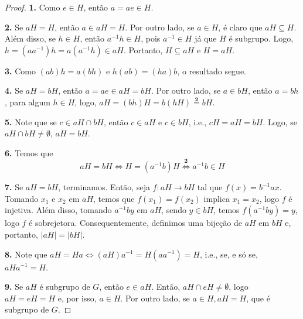 	\begin{proof}
		\textbf{1.} Como $e\in H$, então $a = ae \in H$.
		\par\vspace{0.4cm}
		\textbf{2.} Se $aH = H$, então $a\in aH = H$. Por outro lado, se 
		$a\in H$, é claro que $aH\subseteq H$. Além disso, se $h\in H$, 
		então $a^{-1}h\in H$, pois $a^{-1}\in H$ já que $H$ é subgrupo. 
		Logo, $h = (aa^{-1})h = a(a^{-1}h)\in aH$. Portanto, $H\subseteq aH$ 
		e $H = aH$. 
		\par\vspace{0.4cm}
		\textbf{3.} Como $(ab)h = a(bh)$ e $h(ab) = (ha)b$, o resultado segue.
		\par\vspace{0.4cm}
		\textbf{4.} Se $aH = bH$, então $a = ae\in aH = bH$. Por outro lado,
		se $a\in bH$, então $a = bh$, para algum $h\in H$, logo, 
		$aH = (bh)H = b(hH) \overset{\textbf{2}}{=} bH$.
		\par\vspace{0.4cm}
		\textbf{5.} Note que se $c\in aH\cap bH$, então $c\in aH$ e $c\in bH$, i.e., $cH = aH = bH$. Logo, se $aH\cap bH\neq\emptyset$, $aH = bH$.
		\par\vspace{0.4cm}
		\textbf{6.} Temos que
		\begin{equation*}
		    aH = bH 
		    \iff H = (a^{-1}b)H \overset{\textbf{2}}{\iff} a^{-1}b \in H
		\end{equation*}
		\par\vspace{0.4cm}
		\textbf{7.} Se $aH = bH$, terminamos. Então, seja $f: aH\to bH$ 
		tal que $f(x) = b^{-1}ax$. Tomando $x_1$ e $x_2$ em $aH$, temos que
		$f(x_1) = f(x_2)$ implica $x_1=x_2$, logo $f$ é injetiva. 
		Além disso, tomando $a^{-1}by$ em $aH$, sendo $y\in bH$, temos
		$f(a^{-1}by) = y$, logo $f$ é sobrejetora. Consequentemente, 
		definimos uma bijeção de $aH$ em $bH$ e, portanto, $|aH| = |bH|$.
		\par\vspace{0.4cm}
		\textbf{8.} Note que $aH = Ha \iff (aH)a^{-1} = H(aa^{-1}) = H$,
		i.e., se, e só se, $aHa^{-1} = H$.
		\par\vspace{0.4cm}
		\textbf{9.} Se $aH$ é subgrupo de $G$, então $e\in aH$. Então, 
		$aH\cap eH \neq \emptyset$, logo $aH = eH = H$ e, por isso, 
		$a\in H$. Por outro lado, se $a\in H, aH = H$, que é subgrupo de $G$.
	\end{proof}

